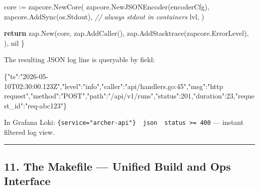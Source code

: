 \documentclass[
]{article}
\newenvironment{Shaded}{}{}
\newcommand{\CommentTok}[1]{\textcolor[rgb]{0.38,0.63,0.69}{\textit{#1}}}
\newcommand{\ControlFlowTok}[1]{\textcolor[rgb]{0.00,0.44,0.13}{\textbf{#1}}}
\newcommand{\DataTypeTok}[1]{\textcolor[rgb]{0.56,0.13,0.00}{#1}}
\newcommand{\DecValTok}[1]{\textcolor[rgb]{0.25,0.63,0.44}{#1}}
\newcommand{\FunctionTok}[1]{\textcolor[rgb]{0.02,0.16,0.49}{#1}}
\newcommand{\NormalTok}[1]{#1}
\newcommand{\OperatorTok}[1]{\textcolor[rgb]{0.40,0.40,0.40}{#1}}
\newcommand{\OtherTok}[1]{\textcolor[rgb]{0.00,0.44,0.13}{#1}}
\newcommand{\StringTok}[1]{\textcolor[rgb]{0.25,0.44,0.63}{#1}}
\begin{document}
\begin{Shaded}
\begin{Highlighting}[]
\NormalTok{    core }\OperatorTok{:=}\NormalTok{ zapcore}\OperatorTok{.}\NormalTok{NewCore}\OperatorTok{(}
\NormalTok{        zapcore}\OperatorTok{.}\NormalTok{NewJSONEncoder}\OperatorTok{(}\NormalTok{encoderCfg}\OperatorTok{),}
\NormalTok{        zapcore}\OperatorTok{.}\NormalTok{AddSync}\OperatorTok{(}\NormalTok{os}\OperatorTok{.}\NormalTok{Stdout}\OperatorTok{),} \CommentTok{// always stdout in containers}
\NormalTok{        lvl}\OperatorTok{,}
    \OperatorTok{)}

    \ControlFlowTok{return}\NormalTok{ zap}\OperatorTok{.}\NormalTok{New}\OperatorTok{(}\NormalTok{core}\OperatorTok{,}
\NormalTok{        zap}\OperatorTok{.}\NormalTok{AddCaller}\OperatorTok{(),}
\NormalTok{        zap}\OperatorTok{.}\NormalTok{AddStacktrace}\OperatorTok{(}\NormalTok{zapcore}\OperatorTok{.}\NormalTok{ErrorLevel}\OperatorTok{),}
    \OperatorTok{),} \OtherTok{nil}
\OperatorTok{\}}
\end{Highlighting}
\end{Shaded}

The resulting JSON log line is queryable by field:

\begin{Shaded}
\begin{Highlighting}[]
\FunctionTok{\{}\DataTypeTok{"ts"}\FunctionTok{:}\StringTok{"2026{-}05{-}10T02:30:00.123Z"}\FunctionTok{,}\DataTypeTok{"level"}\FunctionTok{:}\StringTok{"info"}\FunctionTok{,}\DataTypeTok{"caller"}\FunctionTok{:}\StringTok{"api/handlers.go:45"}\FunctionTok{,}\DataTypeTok{"msg"}\FunctionTok{:}\StringTok{"http request"}\FunctionTok{,}\DataTypeTok{"method"}\FunctionTok{:}\StringTok{"POST"}\FunctionTok{,}\DataTypeTok{"path"}\FunctionTok{:}\StringTok{"/api/v1/runs"}\FunctionTok{,}\DataTypeTok{"status"}\FunctionTok{:}\DecValTok{201}\FunctionTok{,}\DataTypeTok{"duration"}\FunctionTok{:}\DecValTok{23}\FunctionTok{,}\DataTypeTok{"request\_id"}\FunctionTok{:}\StringTok{"req{-}abc123"}\FunctionTok{\}}
\end{Highlighting}
\end{Shaded}

In Grafana Loki:
\texttt{\{service="archer-api"\}\ \textbar{}\ json\ \textbar{}\ status\ \textgreater{}=\ 400}
--- instant filtered log view.

\begin{center}\rule{0.5\linewidth}{0.5pt}\end{center}

\hypertarget{the-makefile-unified-build-and-ops-interface}{%
\subsection{11. The Makefile --- Unified Build and Ops
Interface}\label{the-makefile-unified-build-and-ops-interface}}
\end{document}
